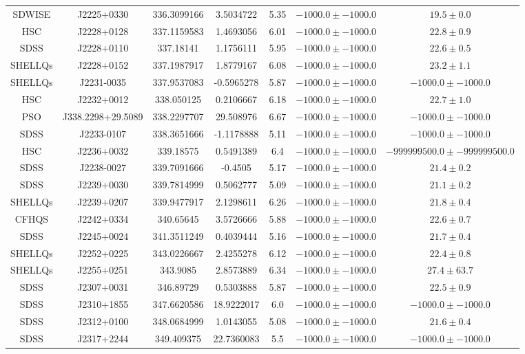\begin{table}
\begin{tabular}{ccccccc}
SDWISE & J2225+0330 & 336.3099166 & 3.5034722 & 5.35 & $-1000.0\pm-1000.0$ & $  19.5\pm  0.0$ \\
HSC & J2228+0128 & 337.1159583 & 1.4693056 & 6.01 & $-1000.0\pm-1000.0$ & $  22.8\pm  0.9$ \\
SDSS & J2228+0110 & 337.18141 & 1.1756111 & 5.95 & $-1000.0\pm-1000.0$ & $  22.6\pm  0.5$ \\
SHELLQs & J2228+0152 & 337.1987917 & 1.8779167 & 6.08 & $-1000.0\pm-1000.0$ & $  23.2\pm  1.1$ \\
SHELLQs & J2231-0035 & 337.9537083 & -0.5965278 & 5.87 & $-1000.0\pm-1000.0$ & $-1000.0\pm-1000.0$ \\
HSC & J2232+0012 & 338.050125 & 0.2106667 & 6.18 & $-1000.0\pm-1000.0$ & $  22.7\pm  1.0$ \\
PSO & J338.2298+29.5089 & 338.2297707 & 29.508976 & 6.67 & $-1000.0\pm-1000.0$ & $-1000.0\pm-1000.0$ \\
SDSS & J2233-0107 & 338.3651666 & -1.1178888 & 5.11 & $-1000.0\pm-1000.0$ & $-1000.0\pm-1000.0$ \\
HSC & J2236+0032 & 339.18575 & 0.5491389 & 6.4 & $-1000.0\pm-1000.0$ & $-999999500.0\pm-999999500.0$ \\
SDSS & J2238-0027 & 339.7091666 & -0.4505 & 5.17 & $-1000.0\pm-1000.0$ & $  21.4\pm  0.2$ \\
SDSS & J2239+0030 & 339.7814999 & 0.5062777 & 5.09 & $-1000.0\pm-1000.0$ & $  21.1\pm  0.2$ \\
SHELLQs & J2239+0207 & 339.9477917 & 2.1298611 & 6.26 & $-1000.0\pm-1000.0$ & $  21.8\pm  0.4$ \\
CFHQS & J2242+0334 & 340.65645 & 3.5726666 & 5.88 & $-1000.0\pm-1000.0$ & $  22.6\pm  0.7$ \\
SDSS & J2245+0024 & 341.3511249 & 0.4039444 & 5.16 & $-1000.0\pm-1000.0$ & $  21.7\pm  0.4$ \\
SHELLQs & J2252+0225 & 343.0226667 & 2.4255278 & 6.12 & $-1000.0\pm-1000.0$ & $  22.4\pm  0.8$ \\
SHELLQs & J2255+0251 & 343.9085 & 2.8573889 & 6.34 & $-1000.0\pm-1000.0$ & $  27.4\pm 63.7$ \\
SDSS & J2307+0031 & 346.89729 & 0.5303888 & 5.87 & $-1000.0\pm-1000.0$ & $  22.5\pm  0.9$ \\
SDSS & J2310+1855 & 347.6620586 & 18.9222017 & 6.0 & $-1000.0\pm-1000.0$ & $-1000.0\pm-1000.0$ \\
SDSS & J2312+0100 & 348.0684999 & 1.0143055 & 5.08 & $-1000.0\pm-1000.0$ & $  21.6\pm  0.4$ \\
SDSS & J2317+2244 & 349.409375 & 22.7360083 & 5.5 & $-1000.0\pm-1000.0$ & $-1000.0\pm-1000.0$ \\

\end{tabular}
\end{table}
